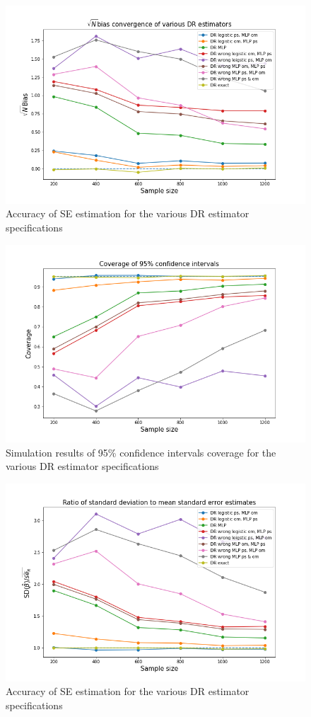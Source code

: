 \documentclass[12pt,twoside]{article}
\begin{document}
\begin{figure}[h!]
    \centering
    \includegraphics[width = 0.9\columnwidth]{figures/sqrtnMLP.png}
    \caption{Accuracy of \citet{lunceford_davidian} SE estimation for the various DR estimator specifications}
    \label{figsqrtnMLP}
\end{figure}

\begin{figure}[h!]
    \centering
    \includegraphics[width = 0.9\columnwidth]{figures/CIMLP.png}
    \caption{Simulation results of 95\% confidence intervals coverage for the various DR estimator specifications}
    \label{figCIMLP}
\end{figure}

\begin{figure}[h!]
    \centering
    \includegraphics[width = 0.9\columnwidth]{figures/SEMLP.png}
    \caption{Accuracy of \citet{lunceford_davidian} SE estimation for the various DR estimator specifications}
    \label{figSEMLP}
\end{figure}
\end{document}

